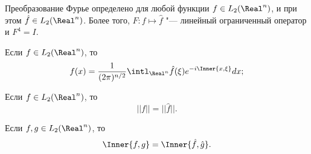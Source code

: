 \documentclass[main]{subfiles}
\begin{document}
\begin{theorem*}
  Преобразование Фурье определено для любой
  функции \( f \in L_2(\Real^n) \),
  и при этом \( \hat f \in L_2(\Real^n) \).
  Более того, \( F : f \mapsto \hat f \) "---
  линейный ограниченный оператор и \( F^4 = I \).
\end{theorem*}

\begin{theorem*}
  Если \( f \in L_2(\Real^n) \), то
  \[
    f(x) = \frac1{(2 \pi)^{n/2}} \intl_{\Real^n} \hat f(\xi) e^{-i\Inner{x, \xi}} dx;
  \]
\end{theorem*}

\begin{theorem*}
  Если \( f \in L_2(\Real^n) \), то
  \[
    ||f|| = ||\hat f||.
  \]
\end{theorem*}

\begin{theorem*}
  Если \( f, g \in L_2(\Real^n) \), то
  \[
    \Inner{f, g} = \Inner{\hat f, \hat g}.
  \]
\end{theorem*}
\end{document}
